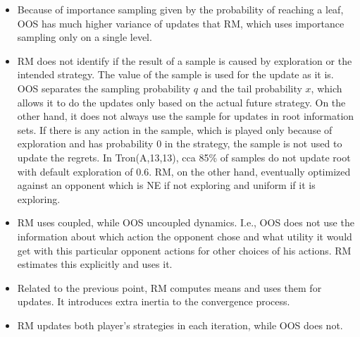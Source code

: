 \documentclass[preprint,12pt]{elsarticle}
\begin{document}
\begin{itemize}
\item Because of importance sampling given by the probability of reaching a leaf, OOS has much higher variance of updates that RM, which uses importance sampling only on a single level.
\item RM does not identify if the result of a sample is caused by exploration or the intended strategy. The value of the sample is used for the update as it is. OOS separates the sampling probability $q$ and the tail probability $x$, which allows it to do the updates only based on the actual future strategy. On the other hand, it does not always use the sample for updates in root information sets. If there is any action in the sample, which is played only because of exploration and has probability 0 in the strategy, the sample is not used to update the regrets. In Tron(A,13,13), cca 85\% of samples do not update root with default exploration of 0.6. RM, on the other hand, eventually optimized against an opponent which is NE if not exploring and uniform if it is exploring.
\item RM uses coupled, while OOS uncoupled dynamics. I.e., OOS does not use the information about which action the opponent chose and what utility it would get with this particular opponent actions for other choices of his actions. RM estimates this explicitly and uses it.
\item Related to the previous point, RM computes means and uses them for updates. It introduces extra inertia to the convergence process.
\item RM updates both player's strategies in each iteration, while OOS does not.

\end{itemize}
\end{document}
